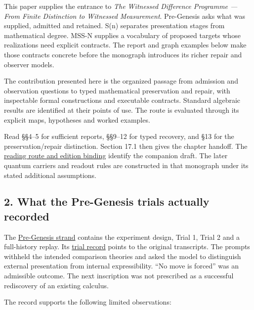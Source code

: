 \documentclass[
  11pt,
]{article}
\begin{document}
This paper supplies the entrance to \emph{The Witnessed Difference
Programme --- From Finite Distinction to Witnessed Measurement}.
Pre-Genesis asks what was supplied, admitted and retained. S(n)
separates presentation stages from mathematical degree. MSS-N supplies a
vocabulary of proposed targets whose realizations need explicit
contracts. The report and graph examples below make those contracts
concrete before the monograph introduces its richer repair and observer
models.

The contribution presented here is the organized passage from admission
and observation questions to typed mathematical preservation and repair,
with inspectable formal constructions and executable contracts. Standard
algebraic results are identified at their points of use. The route is
evaluated through its explicit maps, hypotheses and worked examples.

Read §§4--5 for sufficient reports, §§9--12 for typed recovery, and §13
for the preservation/repair distinction. Section 17.1 then gives the
chapter handoff. The \href{docs/monograph_route.md}{reading route and
edition binding} identify the companion draft. The later quantum
carriers and readout rules are constructed in that monograph under its
stated additional assumptions.

\subsection{2. What the Pre-Genesis trials actually
recorded}\label{what-the-pre-genesis-trials-actually-recorded}

The \href{docs/sources/pre_genesis/readme.txt}{Pre-Genesis strand}
contains the experiment design, Trial 1, Trial 2 and a full-history
replay. Its \href{docs/sources/pre_genesis/02_trial_record.txt}{trial
record} points to the original transcripts. The prompts withheld the
intended comparison theories and asked the model to distinguish external
presentation from internal expressibility. ``No move is forced'' was an
admissible outcome. The next inscription was not prescribed as a
successful rediscovery of an existing calculus.

The record supports the following limited observations:
\end{document}
